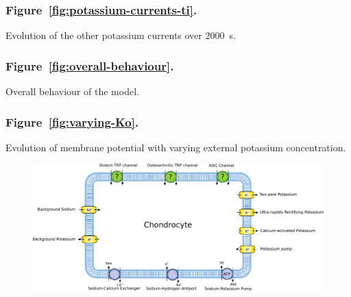 \subsubsection*{Figure~\ref{fig:potassium-currents-ti}.}
Evolution of the other potassium currents over 2000~s.


\subsubsection*{Figure~\ref{fig:overall-behaviour}.}
Overall behaviour of the model.

\subsubsection*{Figure~\ref{fig:varying-Ko}.}
Evolution of membrane potential with varying external potassium concentration.

\clearpage
\begin{figure}
  \centering
  \includegraphics[width=\textwidth]
  {../images/pdf/chondrocyte-model-cellml}
  \caption{}
  \label{fig:chondrocyte-model}
\end{figure}


